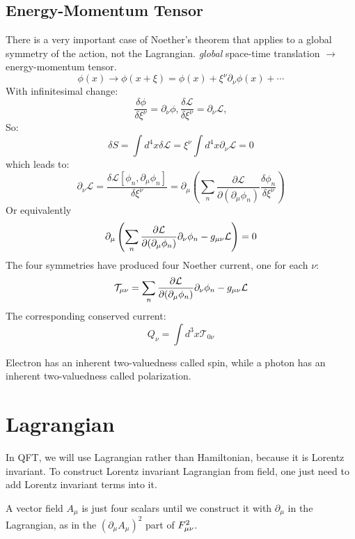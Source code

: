 \subsection{Energy-Momentum Tensor}
There is a very important case of Noether's theorem that applies to a global
symmetry of the action, not the Lagrangian.
\textit{global} space-time translation $\rightarrow$ energy-momentum tensor.  \\
\[ \phi(x) \rightarrow \phi(x+\xi) = \phi(x) + \xi^\nu\partial_\nu\phi(x) + \cdots \]
With infinitesimal change:
\[ \frac{\delta\phi}{\delta\xi^\nu} = \partial_\nu\phi, 
\frac{\delta\mathcal{L}}{\delta\xi^\nu} = \partial_\nu\mathcal{L}, 
\]
So:
\[ \delta S = \int d^4x\delta\mathcal{L} = \xi^\nu\int
d^4x\partial_\nu\mathcal{L} = 0 \]
which leads to:
\[ \partial_\nu\mathcal{L} =
\frac{\delta\mathcal{L}[\phi_n,\partial_\mu\phi_n]}{\delta\xi^\nu} = 
\partial_\mu\left(
\displaystyle\sum_n\frac{\partial\mathcal{L}}{\partial(\partial_\mu\phi_n)}\frac{\delta\phi_n}{\delta\xi^\nu}
\right)
    \]
Or equivalently
\[
\partial_\mu\left(
\displaystyle\sum_n\frac{\partial\mathcal{L}}{\partial(\partial_\mu\phi_n)}\partial_\nu\phi_n
- g_{\mu\nu}\mathcal{L}
\right) = 0
    \]
The four symmetries have produced four Noether current, one for each $\nu$:
\begin{equation}
    \mathcal{T}_{\mu\nu} = 
    \displaystyle\sum_n\frac{\partial\mathcal{L}}{\partial(\partial_\mu\phi_n)}\partial_\nu\phi_n
    - g_{\mu\nu}\mathcal{L}
\end{equation}
The corresponding conserved current:
\[
    Q_\nu = \int d^3x\mathcal{T}_{0\nu} \]


Electron has an inherent two-valuedness called spin, while a photon has
an inherent two-valuedness called polarization.


\section{Lagrangian}
In QFT, we will use Lagrangian rather than Hamiltonian, because it is
Lorentz invariant. To construct Lorentz invariant Lagrangian from field, one
just need to add Lorentz invariant terms into it.

A vector field $A_\mu$ is just four scalars until we construct it with
$\partial_\mu$ in the Lagrangian, as in the $(\partial_{\mu}A_\mu)^2$ part
of $F_{\mu\nu}^2$.

